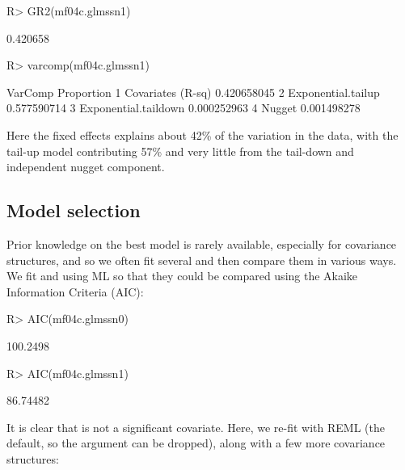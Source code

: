 \documentclass[nojss]{jss}
\renewenvironment{Schunk}{\vspace{\topsep}}{\vspace{\topsep}}
\begin{document}
\begin{Schunk}
\begin{Sinput}
R> GR2(mf04c.glmssn1)
\end{Sinput}
\begin{Soutput}
         [,1]
[1,] 0.420658
\end{Soutput}
\begin{Sinput}
R> varcomp(mf04c.glmssn1)
\end{Sinput}
\begin{Soutput}
               VarComp  Proportion
1    Covariates (R-sq) 0.420658045
2   Exponential.tailup 0.577590714
3 Exponential.taildown 0.000252963
4               Nugget 0.001498278
\end{Soutput}
\end{Schunk}

Here the fixed effects explains about 42\% of the variation in the
data, with the tail-up model contributing 57\% and very little from the tail-down and independent nugget
component.


\subsection{Model selection}

Prior knowledge on the best model is rarely available, especially for
covariance structures, and so we often fit several and then compare
them in various ways. We fit  and
 using ML so that they could be compared using the
Akaike Information Criteria (AIC):

\begin{Schunk}
\begin{Sinput}
R> AIC(mf04c.glmssn0)
\end{Sinput}
\begin{Soutput}
[1] 100.2498
\end{Soutput}
\begin{Sinput}
R> AIC(mf04c.glmssn1)
\end{Sinput}
\begin{Soutput}
[1] 86.74482
\end{Soutput}
\end{Schunk}

It is clear that  is not a significant covariate.  Here,
we re-fit  with REML (the default, so the
 argument can be dropped), along with a few more
covariance structures:
\end{document}
